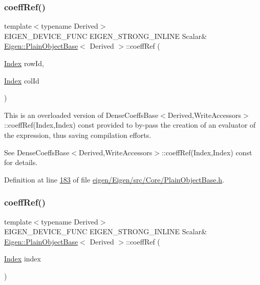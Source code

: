 \subsubsection{\texorpdfstring{coeff\+Ref()}{coeffRef()}\hspace{0.1cm}{\footnotesize\ttfamily [2/8]}}
{\footnotesize\ttfamily template$<$typename Derived$>$ \\
E\+I\+G\+E\+N\+\_\+\+D\+E\+V\+I\+C\+E\+\_\+\+F\+U\+NC E\+I\+G\+E\+N\+\_\+\+S\+T\+R\+O\+N\+G\+\_\+\+I\+N\+L\+I\+NE Scalar\& \hyperlink{class_eigen_1_1_plain_object_base}{Eigen\+::\+Plain\+Object\+Base}$<$ Derived $>$\+::coeff\+Ref (\begin{DoxyParamCaption}\item[{\hyperlink{namespace_eigen_a62e77e0933482dafde8fe197d9a2cfde}{Index}}]{row\+Id,  }\item[{\hyperlink{namespace_eigen_a62e77e0933482dafde8fe197d9a2cfde}{Index}}]{col\+Id }\end{DoxyParamCaption})\hspace{0.3cm}{\ttfamily [inline]}}

This is an overloaded version of Dense\+Coeffs\+Base$<$\+Derived,\+Write\+Accessors$>$\+::coeff\+Ref(\+Index,\+Index) const provided to by-\/pass the creation of an evaluator of the expression, thus saving compilation efforts.

See Dense\+Coeffs\+Base$<$\+Derived,\+Write\+Accessors$>$\+::coeff\+Ref(\+Index,\+Index) const for details. 

Definition at line \hyperlink{eigen_2_eigen_2src_2_core_2_plain_object_base_8h_source_l00183}{183} of file \hyperlink{eigen_2_eigen_2src_2_core_2_plain_object_base_8h_source}{eigen/\+Eigen/src/\+Core/\+Plain\+Object\+Base.\+h}.

\mbox{\label{class_eigen_1_1_plain_object_base_a571632ed666076d7403c8bd3eece44f0}} 
\subsubsection{\texorpdfstring{coeff\+Ref()}{coeffRef()}\hspace{0.1cm}{\footnotesize\ttfamily [3/8]}}
{\footnotesize\ttfamily template$<$typename Derived$>$ \\
E\+I\+G\+E\+N\+\_\+\+D\+E\+V\+I\+C\+E\+\_\+\+F\+U\+NC E\+I\+G\+E\+N\+\_\+\+S\+T\+R\+O\+N\+G\+\_\+\+I\+N\+L\+I\+NE Scalar\& \hyperlink{class_eigen_1_1_plain_object_base}{Eigen\+::\+Plain\+Object\+Base}$<$ Derived $>$\+::coeff\+Ref (\begin{DoxyParamCaption}\item[{\hyperlink{namespace_eigen_a62e77e0933482dafde8fe197d9a2cfde}{Index}}]{index }\end{DoxyParamCaption})\hspace{0.3cm}{\ttfamily [inline]}}

